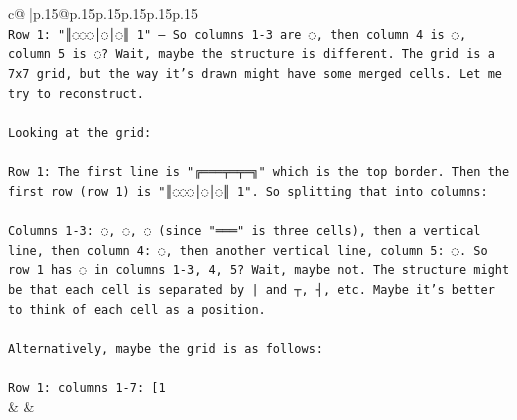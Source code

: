 \documentclass{article}
\begin{document}
{\begin{supertabular}{c@{$\;$}|p{.15\linewidth}@{}p{.15\linewidth}p{.15\linewidth}p{.15\linewidth}p{.15\linewidth}p{.15\linewidth}}
{{{\\ 
\texttt{Row 1: "║◌◌◌│◌│◌║ 1" – So columns 1{-}3 are ◌, then column 4 is ◌, column 5 is ◌? Wait, maybe the structure is different. The grid is a 7x7 grid, but the way it's drawn might have some merged cells. Let me try to reconstruct.} \\
\\ 
\texttt{Looking at the grid:} \\
\\ 
\texttt{Row 1: The first line is "╔═══╤═╤═╗" which is the top border. Then the first row (row 1) is "║◌◌◌│◌│◌║ 1". So splitting that into columns:} \\
\\ 
\texttt{Columns 1{-}3: ◌, ◌, ◌ (since "═══" is three cells), then a vertical line, then column 4: ◌, then another vertical line, column 5: ◌. So row 1 has ◌ in columns 1{-}3, 4, 5? Wait, maybe not. The structure might be that each cell is separated by | and ┬, ┤, etc. Maybe it's better to think of each cell as a position.} \\
\\ 
\texttt{Alternatively, maybe the grid is as follows:} \\
\\ 
\texttt{Row 1: columns 1{-}7: {[}1} \\
            }
        }
    }
    & & \\ \\


\end{supertabular}}
\end{document}
